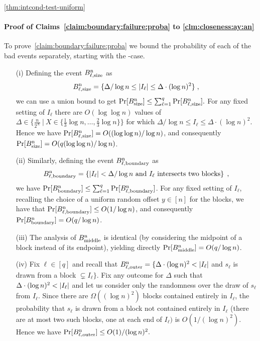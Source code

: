 \begin{proofof}{\cref{thm:intcond-test-uniform}}
\paragraph{Proof of Claims~\ref{claim:boundary:failure:proba} to \ref{clm:closeness:ay:an}}\label{sssec:unif-lb:intcond:claims}


To prove~\cref{claim:boundary:failure:proba}
we bound the probability of each of the bad events separately, starting
with the \no-case.

\begin{itemize}
\item [(i)] \label{proofs:bad:events:guess:size}
Defining the event $B^{\rm n}_{\ell, \rm size}$ as
\[
  B^{\rm n}_{\ell, \rm size} =
     \{ \Delta/\log n \leq \left\lvert I_\ell \right\rvert \leq \Delta \cdot (\log n)^2 \}\;,
\]
we can use a union bound to get
$\Pr[ B^{\rm n}_{\rm size} ] \leq \sum_{\ell=1}^q \Pr[ B^{\rm n}_{\ell, \rm size} ].$
For any fixed setting of $I_\ell$ there are $O(\log \log n)$ values of
$\Delta \in \{{\frac{n}{2^X}} \ | \ X \in \{{\frac{1}3} \log n, \dots,
{\frac{2}3} \log n\}\}$ for which
\mbox{$\Delta/\log n \leq I_\ell \leq \Delta \cdot (\log n)^2$.}  Hence
we have
$\Pr[ B^{\rm n}_{\ell, \rm size} ] = O((\log \log n)/\log n)$, and consequently
\mbox{$\Pr[ B^{\rm n}_{\rm size}]  = O(q(\log \log n)/\log n)$}.

\item [(ii)] \label{proofs:bad:events:boundary:interval}
Similarly, defining  the event $B^{\rm n}_{\ell, \rm boundary}$ as
\[
B^{\rm n}_{\ell, \rm boundary} = \left\{ \left\lvert I_\ell \right\rvert < \Delta/\log n
\text{ and } I_\ell \text{ intersects two blocks} \right\} \;,
\]
 we have
$\Pr[ B^{\rm n}_{\rm boundary} ] \leq
\sum_{\ell=1}^q \Pr[ B^{\rm n}_{\ell, \rm boundary} ] $.
For any fixed setting of $I_\ell$, recalling the choice of a uniform
random offset $y \in [n]$ for the blocks, we have that
$\Pr[B^{\rm n}_{\ell, \rm boundary}] \leq O(1/\log n)$, and consequently
$\Pr[ B^{\rm n}_{\rm boundary} ] = O(q/\log n)$.

\item [(iii)] \label{proofs:bad:events:middle:interval}
The analysis of $B^{\rm n}_{\rm middle}$ is identical (by considering the midpoint of a block instead of its endpoint), yielding directly
$\Pr[ B^{\rm n}_{\rm middle} ] = O(q/\log n)$.

\item [(iv)] Fix $\ell \in [q]$ and recall that
$B^{\rm n}_{\ell,\rm outer} = \{ \Delta\cdot (\log n)^2 < \left\lvert I_\ell \right\rvert$
and $s_\ell$ is drawn from a block $\subsetneq I_\ell \}$.
Fix any outcome for $\Delta$ such that
$\Delta\cdot (\log n)^2 < \left\lvert I_\ell \right\rvert$
and let us consider only the randomness over the draw of
$s_\ell$ from $I_\ell$.
Since there are $\Omega((\log n)^2)$ blocks contained entirely in
$I_\ell$, the probability that $s_\ell$ is drawn from a block not contained entirely in
$I_\ell$ (there are at most two such blocks, one at each end of $I_\ell)$
is $O(1/(\log n)^2)$.
Hence we have
$\Pr[B^{\rm n}_{\ell, \rm outer}] \leq O(1)/(\log n)^2.$


\end{itemize}
\end{proofof}
